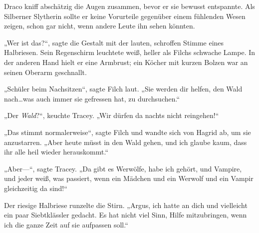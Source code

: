 Draco kniff abschätzig die Augen zusammen, bevor er sie bewusst entspannte. Als Silberner Slytherin sollte er keine Vorurteile gegenüber einem fühlenden Wesen zeigen, schon gar nicht, wenn andere Leute ihn sehen könnten.

„Wer ist das?“, sagte die Gestalt mit der lauten, schroffen Stimme eines Halbriesen. Sein Regenschirm leuchtete weiß, heller als Filchs schwache Lampe. In der anderen Hand hielt er eine Armbrust; ein Köcher mit kurzen Bolzen war an seinen Oberarm geschnallt.

„Schüler beim Nachsitzen“, sagte Filch laut. „Sie werden dir helfen, den Wald nach…was auch immer sie gefressen hat, zu durchsuchen.“

„Der \emph{Wald}?“, keuchte Tracey. „Wir dürfen da nachts nicht reingehen!“

„Das stimmt normalerweise“, sagte Filch und wandte sich von Hagrid ab, um sie anzustarren. „Aber heute müsst in den Wald gehen, und ich glaube kaum, dass ihr alle heil wieder herauskommt.“

„Aber—“, sagte Tracey. „Da gibt es Werwölfe, habe ich gehört, und Vampire, und jeder weiß, was passiert, wenn ein Mädchen und ein Werwolf und ein Vampir gleichzeitig da sind!“

Der riesige Halbriese runzelte die Stirn. „Argus, ich hatte an dich und vielleicht ein paar Siebtklässler gedacht. Es hat nicht viel Sinn, Hilfe mitzubringen, wenn ich die ganze Zeit auf sie aufpassen soll.“

